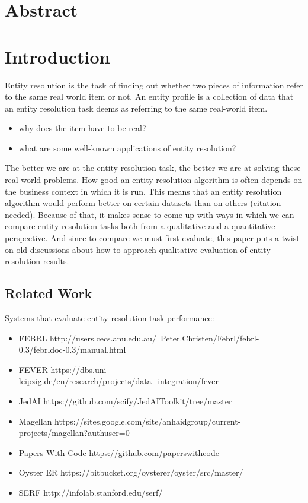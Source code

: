 \documentclass[11pt]{article}
\begin{document}
    \section{Abstract}
    \section{Introduction}
    Entity resolution is the task of finding out whether two pieces of information refer to the same real world item or
    not.
    An entity profile is a collection of data that an entity resolution task deems as referring to the same real-world
    item.
    \begin{itemize}
    \item why does the item have to be real?
    \item what are some well-known applications of entity resolution?
    \end{itemize}
    The better we are at the entity resolution task, the better we are at solving these real-world problems.
    How good an entity resolution algorithm is often depends on the business context in which it is run.
    This means that an entity resolution algorithm would perform better on certain datasets than on others
    (citation needed).
    Because of that, it makes sense to come up with ways in which we can compare entity resolution tasks both from a
    qualitative and a quantitative perspective.
    And since to compare we must first evaluate, this paper puts a twist on old discussions about how to approach
    qualitative evaluation of entity resolution results.

    \subsection[related]{Related Work}

    Systems that evaluate entity resolution task performance:
    \begin{itemize}
        \item FEBRL http://users.cecs.anu.edu.au/~Peter.Christen/Febrl/febrl-0.3/febrldoc-0.3/manual.html
        \item FEVER https://dbs.uni-leipzig.de/en/research/projects/data_integration/fever
        \item JedAI https://github.com/scify/JedAIToolkit/tree/master
        \item Magellan https://sites.google.com/site/anhaidgroup/current-projects/magellan?authuser=0
        \item Papers With Code https://github.com/paperswithcode
        \item Oyster ER https://bitbucket.org/oysterer/oyster/src/master/
        \item SERF http://infolab.stanford.edu/serf/
    \end{itemize}
\end{document}

